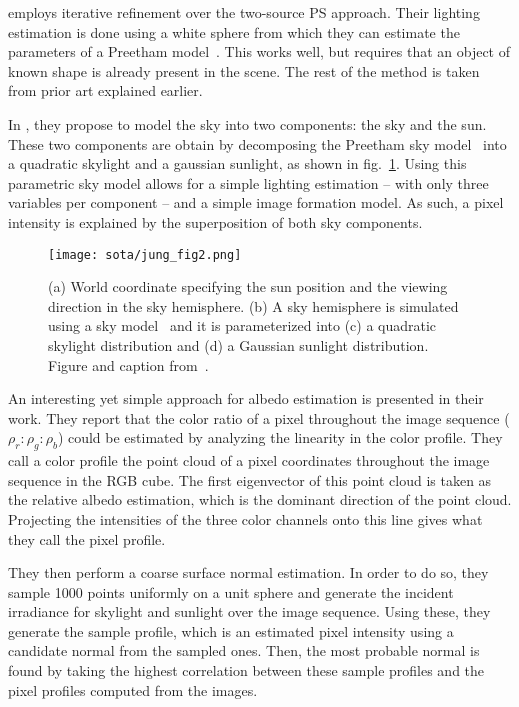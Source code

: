 \cite{inose-tcva-13} employs iterative refinement over the two-source PS approach. Their lighting estimation is done using a white sphere from which they can estimate the parameters of a Preetham model~\cite{preetham-siggraph-99}. This works well, but requires that an object of known shape is already present in the scene. The rest of the method is taken from prior art explained earlier.

In \cite{jung-cvpr-15}, they propose to model the sky into two components: the sky and the sun. These two components are obtain by decomposing the Preetham sky model~\cite{preetham-siggraph-99} into a quadratic skylight and a gaussian sunlight, as shown in fig.~\ref{fig:jung-skysim}. Using this parametric sky model allows for a simple lighting estimation -- with only three variables per component -- and a simple image formation model. As such, a pixel intensity is explained by the superposition of both sky components.

\begin{figure}
\centering
\texttt{[image: sota/jung\_fig2.png]}
\caption{(a) World coordinate specifying the sun position and the viewing direction in the sky hemisphere. (b) A sky hemisphere is simulated using a sky model~\cite{preetham-siggraph-99} and it is parameterized into (c) a quadratic skylight distribution and (d) a Gaussian sunlight distribution. Figure and caption from~\cite{jung-cvpr-15}.}
\label{fig:jung-skysim}
\end{figure}

An interesting yet simple approach for albedo estimation is presented in their work. They report that the color ratio of a pixel throughout the image sequence ($\rho_r : \rho_g : \rho_b$) could be estimated by analyzing the linearity in the color profile. They call a color profile the point cloud of a pixel coordinates throughout the image sequence in the RGB cube. The first eigenvector of this point cloud is taken as the relative albedo estimation, which is the dominant direction of the point cloud. Projecting the intensities of the three color channels onto this line gives what they call the pixel profile.

They then perform a coarse surface normal estimation. In order to do so, they sample 1000 points uniformly on a unit sphere and generate the incident irradiance for skylight and sunlight over the image sequence. Using these, they generate the sample profile, which is an estimated pixel intensity using a candidate normal from the sampled ones. Then, the most probable normal is found by taking the highest correlation between these sample profiles and the pixel profiles computed from the images.

